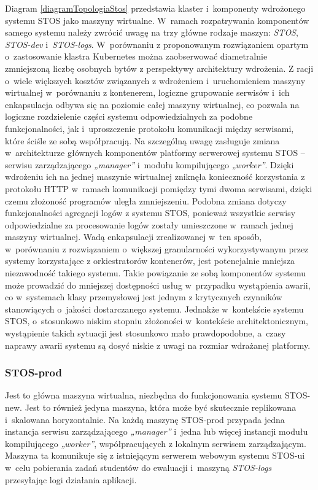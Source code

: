 \noindent Diagram \ref{diagramTopologiaStos} przedstawia klaster i~komponenty wdrożonego systemu STOS jako maszyny wirtualne. W~ramach rozpatrywania komponentów samego systemu należy zwrócić uwagę na trzy główne rodzaje maszyn: \textit{STOS}, \textit{STOS-dev} i~\textit{STOS-logs}. W~porównaniu z proponowanym rozwiązaniem opartym o~zastosowanie klastra Kubernetes można zaobserwować diametralnie zmniejszoną liczbę osobnych bytów z perspektywy architektury wdrożenia. Z racji o~wiele większych kosztów związanych z wdrożeniem i~uruchomieniem maszyny wirtualnej w~porównaniu z kontenerem, logiczne grupowanie serwisów i~ich enkapsulacja odbywa się na poziomie całej maszyny wirtualnej, co pozwala na logiczne rozdzielenie części systemu odpowiedzialnych za podobne funkcjonalności, jak i~uproszczenie protokołu komunikacji między serwisami, które ściśle ze sobą współpracują. Na szczególną uwagę zasługuje zmiana w~architekturze głównych komponentów platformy serwerowej systemu STOS -- serwisu zarządzającego \textit{„manager”} i~modułu kompilującego \textit{„worker”}. Dzięki wdrożeniu ich na jednej maszynie wirtualnej zniknęła konieczność korzystania z protokołu HTTP w~ramach komunikacji pomiędzy tymi dwoma serwisami, dzięki czemu złożoność programów uległa zmniejszeniu. Podobna zmiana dotyczy funkcjonalności agregacji logów z systemu STOS, ponieważ wszystkie serwisy odpowiedzialne za procesowanie logów zostały umieszczone w~ramach jednej maszyny wirtualnej.
\noindent Wadą enkapsulacji zrealizowanej w~ten sposób, w~porównaniu z rozwiązaniem o~większej granularności wykorzystywanym przez systemy korzystające z orkiestratorów kontenerów, jest potencjalnie mniejsza niezawodność takiego systemu. Takie powiązanie ze sobą komponentów systemu może prowadzić do mniejszej dostępności usług w~przypadku wystąpienia awarii, co w~systemach klasy przemysłowej jest jednym z krytycznych czynników stanowiących o~jakości dostarczanego systemu. Jednakże w~kontekście systemu STOS, o~stosunkowo niskim stopniu złożoności w~kontekście architektonicznym, wystąpienie takich sytuacji jest stosunkowo mało prawdopodobne, a~czasy naprawy awarii systemu są dosyć niskie z uwagi na rozmiar wdrażanej platformy.

\subsubsection{STOS-prod}
Jest to główna maszyna wirtualna, niezbędna do funkcjonowania systemu STOS-new. Jest to również jedyna maszyna, która może być skutecznie replikowana i~skalowana horyzontalnie. Na każdą maszynę STOS-prod przypada jedna instancja serwisu zarządzającego \textit{„manager”} i~jedna lub więcej instancji modułu kompilującego \textit{„worker”}, współpracujących z lokalnym serwisem zarządzającym. Maszyna ta komunikuje się z istniejącym serwerem webowym systemu STOS-ui w~celu pobierania zadań studentów do ewaluacji i~maszyną \textit{STOS-logs} przesyłając logi działania aplikacji.

